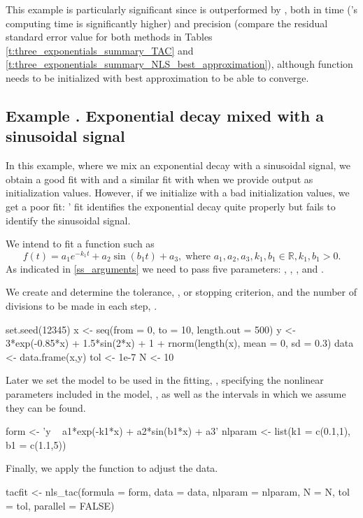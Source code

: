 This example is particularly significant since  is outperformed by , both in time ('s computing time is significantly higher) and precision (compare the residual standard error value for both methods in Tables \ref{t:three_exponentials_summary_TAC} and \ref{t:three_exponentials_summary_NLS_best_approximation}), although  function needs to be initialized with  best approximation to be able to converge.




\addtocounter{n}{1}
\subsection{Example . Exponential decay mixed with a sinusoidal signal}\label{ss_exp_sin}
In this example, where we mix an exponential decay with a sinusoidal signal, we obtain a good fit with  and a similar fit with  when we provide  output as initialization values. However, if we initialize  with a bad initialization values, we get a poor fit: ' fit identifies the exponential decay quite properly but fails to identify the sinusoidal signal.


We intend to fit a function such as
\begin{equation} \label{eq:pattern_exp_sin}
f(t)=a_1 e^{-k_1 t} + a_2 \sin(b_1 t) + a_3, \; \text{where } a_1,a_2,a_3,k_1,b_1 \in \mathbb{R}, k_1,b_1>0.
\end{equation}
As indicated in \ref{ss_arguments} we need to pass five parameters: , , ,  and .

We create  and determine the tolerance, , or stopping criterion, and the number of divisions to be made in each step, .
\begin{example}
  set.seed(12345)
  x <- seq(from = 0, to = 10, length.out = 500)
  y <- 3*exp(-0.85*x) + 1.5*sin(2*x) + 1 + rnorm(length(x), mean = 0, sd = 0.3)
  data <- data.frame(x,y)
  tol <- 1e-7
  N <- 10
\end{example}

Later we set the model to be used in the fitting, , specifying the nonlinear parameters included in the model, , as well as the intervals in which we assume they can be found.
\begin{example}
 form <- 'y ~ a1*exp(-k1*x) + a2*sin(b1*x) + a3'
 nlparam <- list(k1 = c(0.1,1), b1 = c(1.1,5))
\end{example}
Finally, we apply the  function to adjust the data. 
\begin{example}
  tacfit <- nls_tac(formula = form, data = data,  nlparam = nlparam, N = N, tol = tol,
    parallel = FALSE)
\end{example}

